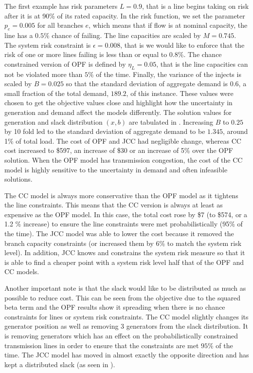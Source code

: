 The first example has risk parameters $L=0.9$, that is a line  begins taking on risk after it is at 90\% of its rated capacity.  In the risk function, we set the parameter $p_e=0.005$ for all branches $e$, which means that if flow is at nominal capacity, the line has a $0.5\%$ chance of failing.  The line capacities are scaled by $M=0.745$. The system risk constraint is $\epsilon=0.008$, that is we would like to enforce that the risk of one or more lines failing is less than or equal to  $0.8\%$.  The chance constrained version of OPF is defined by $\eta_L=0.05$, that is the line capacities can not be violated more than $5\%$ of the time.  Finally, the variance of the injects is scaled by $B=0.025$ so that the standard deviation of aggregate demand is $0.6$, a small fraction of the total demand, $189.2$, of this instance.  These values were chosen to get the objective values close and highlight how the uncertainty in generation and demand affect the models differently. The solution values for generation and slack distribution $(x,b)$ are tabulated in .  Increasing $B$ to $0.25$ by 10 fold led to the standard deviation of aggregate demand to be $1.345$, around 1\% of total load.  The cost of OPF and JCC had negligible change, whereas CC cost increased to \$597, an increase of \$30 or an increase of 5\% over the OPF solution. When the OPF model has transmission congestion, the cost of the CC model is highly sensitive to the uncertainty in demand  and  often infeasible solutions.



The CC model is always more conservative than the OPF model as it tightens the line constraints.  This means that the CC version is always at least as expensive as the OPF model.  In this case, the total cost rose by \$7 (to \$574, or a 1.2 \% increase) to ensure the line constraints were met probabilistically (95\% of the time).  The JCC model was able to lower the cost because it removed the branch capacity constraints (or increased them by 6\% to match the system risk level).  In addition, JCC knows and constrains the system risk measure so that it is able to find a cheaper point with a system risk level half that of the OPF and CC models.



Another important note is that the slack would like to be distributed as much as possible to reduce cost.  This can be seen from the objective  due to the squared beta term and the OPF results show it spreading when there is no chance constraints for lines or system risk constraints.  The CC model slightly changes its generator position as well as removing 3 generators from the slack distribution.  It is removing generators which has an effect on the probabilistically constrained transmission lines in order to ensure that the constraints are met $95\%$ of the time.  The JCC model has moved in almost exactly the opposite direction and has kept a distributed slack (as seen in ).




